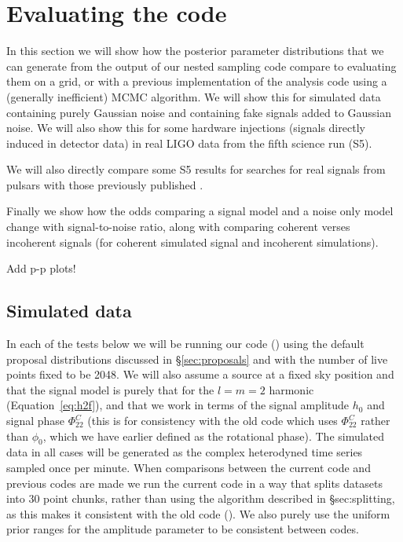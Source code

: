 \section{Evaluating the code}

In this section we will show how the posterior parameter distributions that we can generate from the output
of our nested sampling code compare to evaluating them on a grid, or with a previous implementation of the analysis code
\citep[\lppe used in e.g.][]{2014ApJ...785..119A} using a (generally inefficient) MCMC algorithm. We will show this for
simulated data containing purely Gaussian noise and containing fake signals added to Gaussian noise. We will also
show this for some hardware injections (signals directly induced in detector data) in real LIGO data from the fifth
science run (S5).

We will also directly compare some S5 results for searches for real signals from pulsars with those previously published
\citep{2010ApJ...713..671A}.

Finally we show how the odds comparing a signal model and a noise only model change with signal-to-noise ratio, along
with comparing coherent verses incoherent signals (for coherent simulated signal and incoherent simulations).

Add p-p plots!

\subsection{Simulated data}

In each of the tests below we will be running our code (\lppen) using the default proposal distributions discussed in \S\ref{sec:proposals}
and with the number of live points fixed to be 2048. We will also assume a source at a fixed sky position and that the signal model is purely
that for the $l=m=2$ harmonic (Equation~\ref{eq:h2f}), and that we work in terms of the signal amplitude $h_0$ and signal phase
$\Phi_{22}^C$ (this is for consistency with the old code which uses $\Phi_{22}^C$ rather than $\phi_0$, which we have earlier defined as the
rotational phase). The simulated data in all cases 
will be generated as the complex heterodyned
time series sampled once per minute. When comparisons between the current code and previous codes are 
made we run the current code in a way that splits datasets into 30 point chunks, rather than using the algorithm described in \S{sec:splitting},
as this makes it consistent with the old code (\lppe). We also purely use the uniform prior ranges for the amplitude parameter to be
consistent between codes.

